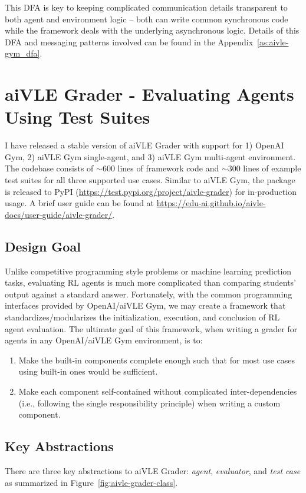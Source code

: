 This DFA is key to keeping complicated communication details transparent to both agent and environment logic – both can write common synchronous code while the framework deals with the underlying asynchronous logic. Details of this DFA and messaging patterns involved can be found in the Appendix~\ref{as:aivle-gym_dfa}.

\section{aiVLE Grader - Evaluating Agents Using Test Suites}
\label{ch:aivle-grader}
I have released a stable version of aiVLE Grader with support for 1) OpenAI Gym, 2) aiVLE Gym single-agent, and 3) aiVLE Gym multi-agent environment. The codebase consists of $\sim$600 lines of framework code and $\sim$300 lines of example test suites for all three supported use cases. Similar to aiVLE Gym, the package is released to PyPI  (\href{https://test.pypi.org/project/aivle-grader/}{https://test.pypi.org/project/aivle-grader}) for in-production usage. A brief user guide can be found at \href{https://edu-ai.github.io/aivle-docs/user-guide/aivle-grader/}{https://edu-ai.github.io/aivle-docs/user-guide/aivle-grader/}.

\subsection{Design Goal}
Unlike competitive programming style problems or machine learning prediction tasks, evaluating RL agents is much more complicated than comparing students’ output against a standard answer. Fortunately, with the common programming interfaces provided by OpenAI/aiVLE Gym, we may create a framework that standardizes/modularizes the initialization, execution, and conclusion of RL agent evaluation. The ultimate goal of this framework, when writing a grader for agents in any OpenAI/aiVLE Gym environment, is to:
\begin{enumerate}
    \item Make the built-in components complete enough such that for most use cases using built-in ones would be sufficient.
    \item Make each component self-contained without complicated inter-dependencies (i.e., following the single responsibility principle) when writing a custom component.
\end{enumerate}

\subsection{Key Abstractions}
There are three key abstractions to aiVLE Grader: \textit{agent}, \textit{evaluator}, and \textit{test case} as summarized in Figure~\ref{fig:aivle-grader-class}.

